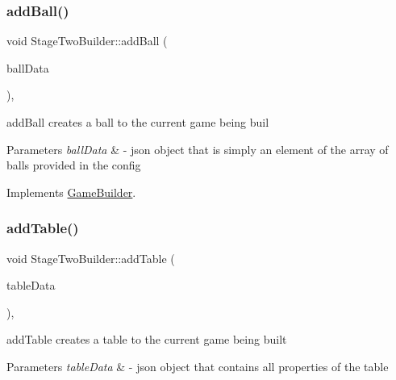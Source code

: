 \subsubsection{\texorpdfstring{add\+Ball()}{addBall()}}
{\footnotesize\ttfamily void Stage\+Two\+Builder\+::add\+Ball (\begin{DoxyParamCaption}\item[{Q\+Json\+Object \&}]{ball\+Data }\end{DoxyParamCaption})\hspace{0.3cm}{\ttfamily [override]}, {\ttfamily [virtual]}}



add\+Ball creates a ball to the current game being buil 


\begin{DoxyParams}{Parameters}
{\em ball\+Data} & -\/ json object that is simply an element of the array of balls provided in the config \\
\hline
\end{DoxyParams}


Implements \mbox{\hyperlink{class_game_builder_a836186637bd2f7844f7dfac0135d833b}{Game\+Builder}}.

\mbox{\label{class_stage_two_builder_a7326ee514e752cab6d994352f5ef68e0}} 
\subsubsection{\texorpdfstring{add\+Table()}{addTable()}}
{\footnotesize\ttfamily void Stage\+Two\+Builder\+::add\+Table (\begin{DoxyParamCaption}\item[{Q\+Json\+Object \&}]{table\+Data }\end{DoxyParamCaption})\hspace{0.3cm}{\ttfamily [override]}, {\ttfamily [virtual]}}



add\+Table creates a table to the current game being built 


\begin{DoxyParams}{Parameters}
{\em table\+Data} & -\/ json object that contains all properties of the table \\
\hline
\end{DoxyParams}


